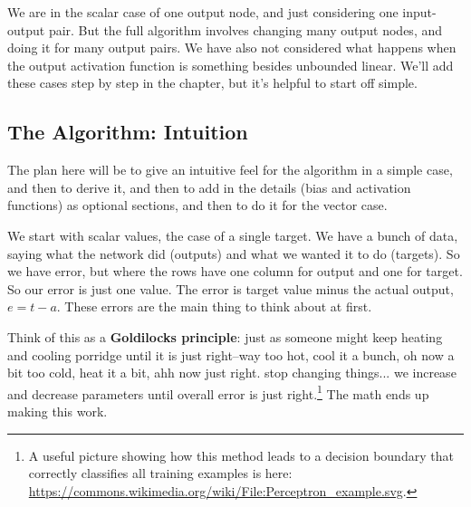 We are in the scalar case of one output node, and just considering one input-output pair. But the full algorithm involves changing many output nodes, and doing it for many output pairs.  We have also not considered what happens when the output activation function is something besides unbounded linear. We'll add these cases step by step in the chapter, but it's helpful to start off simple.


\subsection{The Algorithm: Intuition}

The plan here will be to give an intuitive feel for the algorithm in a simple case, and then to derive it, and then to add in the details (bias and activation functions) as optional sections, and then to do it for the vector case.

We start with scalar values, the case of a single target. We have a bunch of data, saying what the network did (outputs) and what we wanted it to do (targets). So we have error, but where the rows have one column for output and one for target. So our error is just one value. The error is target value minus the actual output, $e = t-a$. These errors are the main thing to think about at first. 

Think of this as a  {\bf Goldilocks principle}: just as someone might keep heating and cooling porridge until it is just right--way too hot, cool it a bunch, oh now a bit too cold, heat it a bit, ahh now just right. stop changing things... we increase and decrease parameters until overall error is just right.\footnote{A useful picture showing how this method leads to a decision boundary that correctly classifies all training examples is here: \url{https://commons.wikimedia.org/wiki/File:Perceptron_example.svg}.} The math ends up making this work.

 
